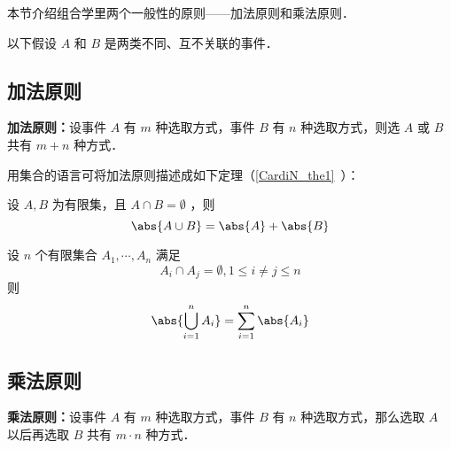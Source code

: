 
本节介绍组合学里两个一般性的原则——加法原则和乘法原则．

以下假设 $A$ 和 $B$ 是两类不同、互不关联的事件．
\subsection{加法原则}
\textbf{加法原则：}设事件 $A$ 有 $m$ 种选取方式，事件 $B$ 有 $n$ 种选取方式，则选 $A$ 或 $B$ 共有 $m+n$ 种方式．

用集合的语言可将加法原则描述成如下定理（\autoref{CardiN_the1}~）：
\begin{theorem}{}
设 $A,B$ 为有限集，且 $A\cap B=\emptyset$ ，则
\begin{equation}
\abs{A\cup B}=\abs{A}+\abs{B}
\end{equation}
\end{theorem}
\begin{corollary}{}
设 $n$ 个有限集合 $A_1,\cdots,A_n$ 满足
\begin{equation}
A_i\cap A_j=\emptyset,1\leq i\neq j\leq n
\end{equation}
则
\begin{equation}
\abs{\bigcup_{i=1}^n A_i}=\sum_{i=1}^n\abs{A_i}
\end{equation}

\end{corollary}
\subsection{乘法原则}
\textbf{乘法原则：}设事件 $A$ 有 $m$ 种选取方式，事件 $B$ 有 $n$ 种选取方式，那么选取 $A$ 以后再选取 $B$ 共有 $m\cdot n$ 种方式．
